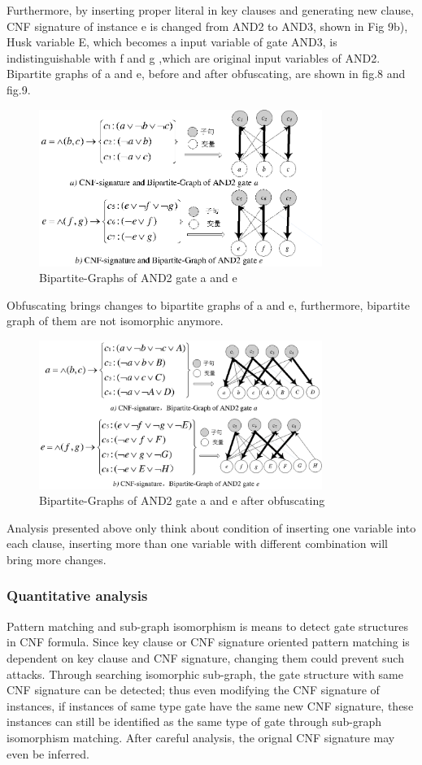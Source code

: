 \documentclass[runningheads,a4paper]{llncs}
\begin{document}
Furthermore, by inserting proper literal in key clauses and generating new clause, CNF signature of instance e is changed from AND2 to AND3, shown in Fig 9b), Husk variable E, which becomes a input variable of gate AND3, is indistinguishable with f and g ,which are original input variables of AND2.
Bipartite graphs of a and e, before and after obfuscating, are shown in fig.8 and fig.9.
\begin{figure}
\centering
\includegraphics[width=9.2cm]{a8}
\caption{Bipartite-Graphs of AND2 gate a and e}
\label{fig:example}
\end{figure}
Obfuscating brings changes to bipartite graphs of a and e, furthermore, bipartite graph of them are not isomorphic anymore.
\begin{figure}
\centering
\includegraphics[width=9.2cm]{a9}
\caption{Bipartite-Graphs of AND2 gate a and e after obfuscating}
\label{fig:example}
\end{figure}
Analysis presented above only think about condition of inserting one variable into each clause, inserting more than one variable with different combination will bring more changes. 

\subsubsection{Quantitative analysis} 
Pattern matching and sub-graph isomorphism is means to detect gate structures in CNF formula. Since key clause or CNF signature oriented pattern matching is dependent on key clause and CNF signature, changing them could prevent such attacks. Through searching isomorphic sub-graph, the gate structure with same CNF signature can be detected; thus even modifying the CNF signature of instances, if instances of same type gate have the same new CNF signature, these instances can still be identified as the same type of gate through sub-graph isomorphism matching. After careful analysis, the orignal CNF signature may even be inferred. 
\end{document}
